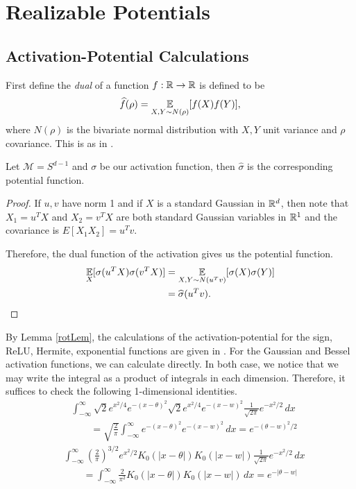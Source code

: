 
\section{Realizable Potentials}
\label{sec:realizable}

\subsection{Activation-Potential Calculations}
First define the {\it dual} of a function $f: {\mathbb{R}} \to {\mathbb{R}}$ is defined to be 
%
\[ \widehat{f}(\rho) = \operatorname*{\mathbb{E}}_{X,Y \sim N(\rho)}[f(X)f(Y)],\]
%
where $N(\rho)$ is the bivariate normal distribution with $X, Y$ unit variance and $\rho$ covariance. This is as in \cite{DanielyFS16}.
%
\begin{lemma}\label{rotLem}
Let $\mathcal{M} = S^{d-1}$ and $\sigma$ be our activation function, then $\widehat{\sigma}$ is the corresponding potential function.
\end{lemma}

\begin{proof}
If $u, v$ have norm 1 and if $X$ is a standard Gaussian in ${\mathbb{R}}^d$, then note that $X_1 = u^TX$ and $X_2 = v^TX$ are both standard Gaussian variables in ${\mathbb{R}}^1$ and the covariance is $E[X_1X_2] = u^Tv$. 

Therefore, the dual function of the activation gives us the potential function.
\begin{align*}
\operatorname*{\mathbb{E}}_{X}[\sigma(u^TX)\sigma(v^TX)] & =
\operatorname*{\mathbb{E}}_{X,Y \sim N(u^Tv)}[\sigma(X)\sigma(Y)] \\
& = \widehat{\sigma}(u^Tv).
\end{align*}
\end{proof}

By Lemma \ref{rotLem}, the calculations of the activation-potential
for the sign, ReLU, Hermite, exponential functions are given in
\cite{DanielyFS16}. For the Gaussian and Bessel activation functions,
we can calculate directly. In both case, we notice that we may write
the integral as a product of integrals in each dimension. Therefore,
it suffices to check the following 1-dimensional identities.
\begin{align*}
  & \int_{-\infty}^\infty
    \sqrt{2}e^{x^2/4}e^{-(x-\theta)^2}\sqrt{2}e^{x^2/4}e^{-(x-w)^2} \frac{1}{\sqrt{2\pi}} e^{-x^2/2}\, dx \\
  & \qquad = \sqrt{\frac{2}{\pi}}\int_{-\infty}^\infty
    e^{-(x-\theta)^2}e^{-(x-w)^2} \, dx = e^{-(\theta -w)^2/2}
\end{align*}
\begin{align*}
& \int_{-\infty}^\infty (\frac{2}{\pi})^{3/2}e^{x^2/2}K_0(|x-\theta|)K_0(|x-w|)  \frac{1}{\sqrt{2\pi}} e^{-x^2/2}\, dx \\
& \qquad 
= \int_{-\infty}^\infty \frac{2}{\pi^2}K_0(|x-\theta|)K_0(|x-w|) \, dx
  = e^{-|\theta -w|}
\end{align*}


